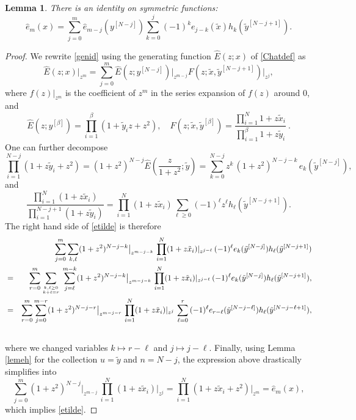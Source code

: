 \documentclass[12pt]{amsart}
\newtheorem{lemma}[thm]{Lemma}
\numberwithin{equation}{section}
\begin{document}
\begin{lemma}\label{finlutcomb}
There is an identity on symmetric functions:
\begin{equation}\label{genid}
{\hat e}_m(x)=\sum_{j=0}^m {\hat e}_{m-j}({ y}^{[N-j]}) 
\sum_{k=0}^{j} (-1)^k e_{j-k}({\tilde x}) h_{k}({\tilde  y}^{[N-j+1]}).
\end{equation}
\end{lemma}
\begin{proof}
We rewrite \eqref{genid} using the generating function ${\hat E}(z;x)$ of \eqref{Chatdef} as
\begin{equation}\label{etilde}{\hat E}(z;x)\vert_{z^m}=\sum_{j=0}^m {\hat E}(z;{y}^{[N-j]})
\vert_{z^{m-j}} F(z;{\tilde x},{\tilde y}^{[N-j+1]})\vert_{z^{j}},\end{equation}
where $f(z)\vert_{z^m}$ is the coefficient of $z^m$ in the series expansion of $f(z)$ around $0$, and
$${\hat E}(z;{y}^{[\beta]})=\prod_{i=1}^{\beta}(1+{\tilde y}_i z+z^2), \quad 
F(z;{\tilde x},{\tilde y}^{[\beta]})=\frac{\prod_{i=1}^N 1+z\tilde{x}_i}{\prod_{i=1}^{\beta} 1+z\tilde{y}_i} \ .$$
%
%
%
%
%
%
%
%
%
%
%
One can further decompose
$$\prod_{i=1}^{N-j} (1+z {\tilde y}_i+z^2)=(1+z^2)^{N-j} {\hat E}(\frac{z}{1+z^2};\tilde{y}) =\sum_{k=0}^{N-j} z^k\,(1+z^2)^{N-j-k} \,e_k(\tilde{y}^{[N-j]}),$$
and
$$\frac{\prod_{i=1}^N (1+z {\tilde x}_i)}{\prod_{i=1}^{N-j+1} (1+z {\tilde y}_i)}=\prod_{i=1}^N (1+z {\tilde x}_i) \sum_{\ell\geq 0} (-1)^\ell z^\ell h_\ell(\tilde{y}^{[N-j+1]}).$$
The right hand side of  \eqref{etilde} is therefore
\begin{eqnarray}
&&\sum_{j=0}^m  \sum_{k,\ell} (1+z^2)^{N-j-k} \big\vert_{z^{m-j-k}}\, \prod_{i=1}^N(1+z {\tilde x}_i)\vert_{z^{j-\ell}}\, (-1)^\ell e_k(\tilde{y}^{[N-j]})
h_\ell({\tilde  y}^{[N-j+1]})\nonumber \\
&=&\sum_{r=0}^m  \sum_{k,\ell \geq 0\atop k+\ell=r}\, \sum_{j=\ell}^{m-k} (1+z^2)^{N-j-k} \big\vert_{z^{m-j-k}}\, 
\prod_{i=1}^N(1+z {\tilde x}_i)\vert_{z^{j-\ell}}\, 
(-1)^\ell e_k(\tilde{y}^{[N-j]}) h_\ell(\tilde{y}^{[N-j+1]}),\nonumber \\
&=&\sum_{r=0}^m  \sum_{j=0}^{m-r} (1+z^2)^{N-j-r} \big\vert_{z^{m-j-r}}\, 
\prod_{i=1}^N(1+z {\tilde x}_i)\vert_{z^{j}}\, \sum_{\ell =0}^{r}\, 
(-1)^\ell e_{r-\ell}(\tilde{y}^{[N-j-\ell]}) h_\ell(\tilde{y}^{[N-j-\ell+1]}),\nonumber \\
&&\label{presquefini}
\end{eqnarray}
where we changed variables $k\mapsto r-\ell$ and $j\mapsto j-\ell$.
Finally, using Lemma \ref{lemeh} for the collection $u={\tilde y}$ and $n=N-j$, the expression above drastically simplifies into
$$\sum_{j=0}^{m} (1+z^2)^{N-j} \big\vert_{z^{m-j}}\, 
\prod_{i=1}^N(1+z {\tilde x}_i)\vert_{z^{j}}=\prod_{i=1}^N (1+z {\tilde x}_i+z^2)\big\vert_{z^m} ={\hat e}_m(x),$$
which implies \eqref{etilde}. 
\end{proof}
\end{document}
